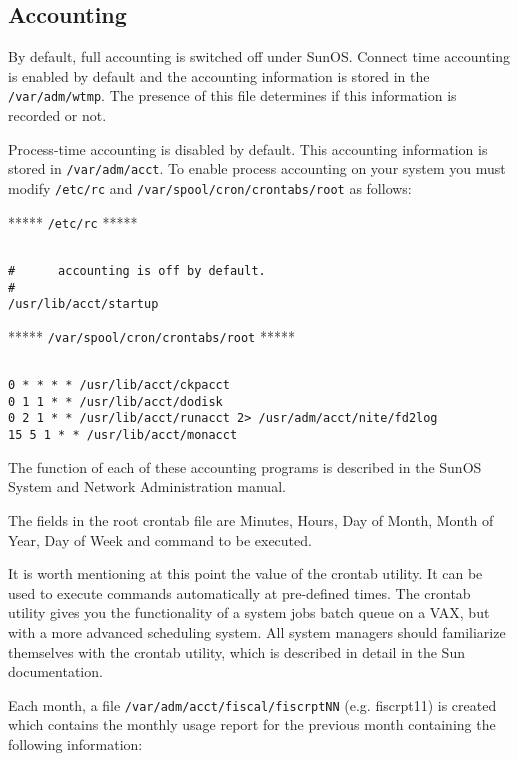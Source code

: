 \subsection{Accounting}

By default, full accounting is switched off under SunOS. Connect time
accounting is enabled by default and the accounting information is stored in the
{\tt /var/adm/wtmp}. The presence of this file determines if this information
is recorded or not.

Process-time accounting is disabled by default. This accounting information is
stored in {\tt /var/adm/acct}. To enable process accounting on your system you
must modify {\tt /etc/rc} and {\tt /var/spool/cron/crontabs/root} as follows:

***** {\tt /etc/rc} *****

\begin{verbatim}

#      accounting is off by default.
#
/usr/lib/acct/startup

\end{verbatim}

***** {\tt /var/spool/cron/crontabs/root} *****

\begin{verbatim}

0 * * * * /usr/lib/acct/ckpacct
0 1 1 * * /usr/lib/acct/dodisk
0 2 1 * * /usr/lib/acct/runacct 2> /usr/adm/acct/nite/fd2log
15 5 1 * * /usr/lib/acct/monacct

\end{verbatim}


The function of each of these accounting programs is described in
the SunOS System and Network Administration manual.

The fields in the root crontab file are Minutes, Hours, Day of Month,
Month of Year, Day of Week and command to be executed.

It is worth mentioning at this point the value of the crontab utility.
It can be used to execute commands automatically at pre-defined times. The
crontab utility gives you the functionality of a system jobs batch queue
on a VAX, but with a more advanced scheduling system. All system managers
should familiarize themselves with the crontab utility, which is described
in detail in the Sun documentation.

Each month, a file {\tt /var/adm/acct/fiscal/fiscrptNN} (e.g. fiscrpt11)
is created which contains the monthly usage report for the previous month
containing the following information:

